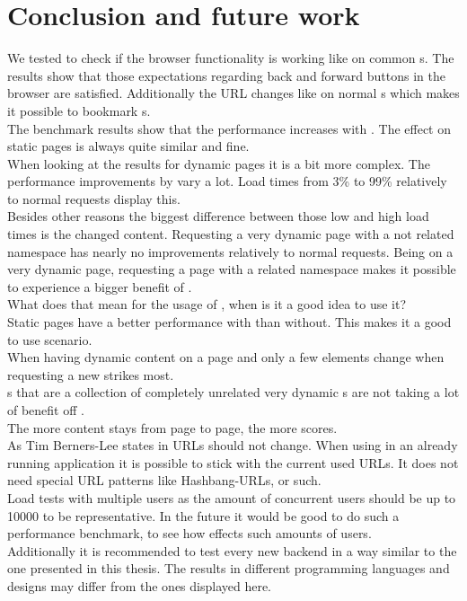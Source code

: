 \section{Conclusion and future work}

We tested \lare{} to check if the browser functionality is working like on common \webApplication{}s.
The results show that those expectations regarding back and forward buttons in the browser are satisfied.
Additionally the URL changes like on normal \webApplication{}s which makes it possible to bookmark \webPage{}s.
\\
The benchmark results show that the performance increases with \lare{}.
The effect on static pages is always quite similar and fine.
\\
When looking at the results for dynamic pages it is a bit more complex.
The performance improvements by \lare{} vary a lot.
Load times from 3\% to 99\% relatively to normal requests display this.
\\
Besides other reasons the biggest difference between those low and high load times is the changed content.
Requesting a very dynamic page with a not related namespace has nearly no improvements relatively to normal requests.
Being on a very dynamic page, requesting a page with a related namespace makes it possible to experience a bigger benefit of \lare{}.
\\
What does that mean for the usage of \lare{}, when is it a good idea to use it?
\\
Static pages have a better performance with \lare{} than without.
This makes it a good to use scenario.
\\
When having dynamic content on a page and only a few elements change when requesting a new \webPage{} \lare{} strikes most.
\\
\WebSite{}s that are a collection of completely unrelated very dynamic \webPage{}s are not taking a lot of benefit off \lare{}.
\\
The more content stays from page to page, the more \lare{} scores.
\\
As Tim Berners-Lee states in \cite{berners1998cool} URLs should not change.
When using \lare{} in an already running application it is possible to stick with the current used URLs.
It does not need special URL patterns like Hashbang-URLs, or such.
\\
Load tests with multiple users as the amount of concurrent users should be up to 10000 to be representative\cite{bozdag2008performance}.
In the future it would be good to do such a performance benchmark, to see how \lare{} effects such amounts of users.
\\
Additionally it is recommended to test every new \lare{} backend in a way similar to the one presented in this thesis.
The results in different programming languages and \webApplication{} designs may differ from the ones displayed here.
